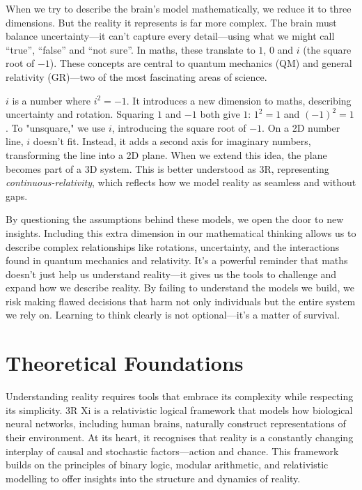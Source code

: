 \documentclass[12pt]{article}
\begin{document}
When we try to describe the brain’s model mathematically, we reduce it to three dimensions. But the reality it represents is far more complex. The brain must balance uncertainty—it can’t capture every detail—using what we might call ``true'', ``false'' and ``not sure''. In maths, these translate to $1$, $0$ and $i$ (the square root of $-1$). These concepts are central to quantum mechanics (QM) and general relativity (GR)—two of the most fascinating areas of science.

$i$ is a number where $i^2 = -1$. It introduces a new dimension to maths, describing uncertainty and rotation. Squaring $1$ and $-1$ both give $1$: $1^2 = 1$ and $(-1)^2 = 1$. To "unsquare," we use $i$, introducing the square root of $-1$. On a 2D number line, $i$ doesn’t fit. Instead, it adds a second axis for imaginary numbers, transforming the line into a 2D plane. When we extend this idea, the plane becomes part of a 3D system. This is better understood as 3R, representing \emph{continuous-relativity}, which reflects how we model reality as seamless and without gaps.

By questioning the assumptions behind these models, we open the door to new insights. Including this extra dimension in our mathematical thinking allows us to describe complex relationships like rotations, uncertainty, and the interactions found in quantum mechanics and relativity. It’s a powerful reminder that maths doesn’t just help us understand reality—it gives us the tools to challenge and expand how we describe reality. By failing to understand the models we build, we risk making flawed decisions that harm not only individuals but the entire system we rely on. Learning to think clearly is not optional—it’s a matter of survival.

\section*{Theoretical Foundations}

Understanding reality requires tools that embrace its complexity while respecting its simplicity. 3R Xi is a relativistic logical framework that models how biological neural networks, including human brains, naturally construct representations of their environment. At its heart, it recognises that reality is a constantly changing interplay of causal and stochastic factors—action and chance. This framework builds on the principles of binary logic, modular arithmetic, and relativistic modelling to offer insights into the structure and dynamics of reality.
\end{document}
